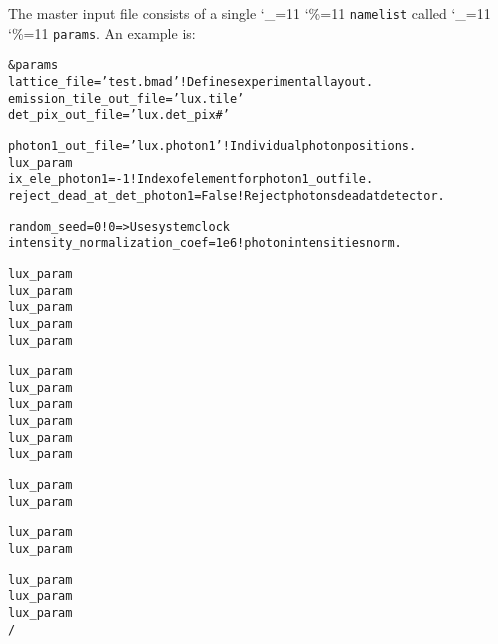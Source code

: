 \documentclass[11pt]{article}
\newcommand\ttcmd{\begingroup\catcode`\_=11 \catcode`\%=11 \dottcmd}
\newcommand\dottcmd[1]{\texttt{#1}\endgroup}
\newcommand{\vn}{\ttcmd}
\newenvironment{example}
  {\vspace{\ExBeg} \begin{alltt}}
  {\end{alltt} \vspace{\ExEnd}}
\newlength{\ExBeg}
\newlength{\ExEnd}
\begin{document}
The master input file consists of a single \vn{namelist} called \vn{params}.
An example is:
\begin{example}
  &params
  	lattice_file = 'test.bmad'                     ! Defines experimental layout.
    emission_tile_out_file = 'lux.tile'
    det_pix_out_file = 'lux.det_pix#'

    photon1_out_file = 'lux.photon1'               ! Individual photon positions.
    lux_param%
    ix_ele_photon1 = -1                            ! Index of element for photon1_out file.
    reject_dead_at_det_photon1 = False             ! Reject photons dead at detector.

    random_seed = 0                                ! 0 => Use system clock
    intensity_normalization_coef = 1e6             ! photon intensities norm.

    lux_param%
    lux_param%
    lux_param%
    lux_param%
    lux_param%

    lux_param%
    lux_param%
    lux_param%
    lux_param%
    lux_param%
    lux_param%

    lux_param%
    lux_param%

    lux_param%
    lux_param%

    lux_param%
    lux_param%
    lux_param%
  /
\end{example}
\end{document}
